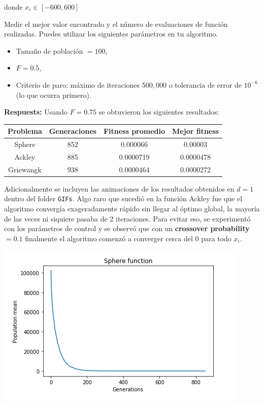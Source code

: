 \documentclass[10pt, letterpaper]{article}
\theoremstyle{definition}
\begin{document}
\begin{enumerate}
\begin{enumerate}
                donde $x_i \in [-600, 600]$
        \end{enumerate}
    Medir el mejor valor encontrado y el número de evaluaciones de función
    realizadas. Puedes utilizar los siguientes parámetros en tu algoritmo.
        \begin{itemize}
            \item Tamaño de población $=100$,
            \item $F=0.5$,
            \item Criterio de paro: máximo de iteraciones $500,000$ o tolerancia
            de error de $10^{-6}$ (lo que ocurra primero).
        \end{itemize}
    \textbf{Respuests:} Usando $F=0.75$ se obtuvieron los siguientes resultados:
    \begin{center} \begin{tabular}{ |c|c|c|c| }
        \hline
        Problema & Generaciones & Fitness promedio & Mejor fitness \\
        \hline
        Sphere  & 852 & 0.000066 & 0.00003 \\
        Ackley  & 885 & 0.0000719 & 0.0000478 \\
        Griewangk  & 938 & 0.0000464 & 0.0000272 \\
        \hline
    \end{tabular} \end{center}
    Adicionalmente se incluyen las animaciones de los resultados obtenidos
    en $d=1$ dentro del folder \texttt{GIFs}. Algo raro que sucedió en la función
    Ackley fue que el algoritmo convergía exageradamente rápido sin llegar al
    óptimo global, la mayoría de las veces ni siquiere pasaba de  2 iteraciones.
    Para evitar eso, se experimentó con los parámetros de control y se observó
    que con un \textbf{crossover probability}$=0.1$ finalmente
    el algoritmo comenzó a converger cerca del $0$ para todo $x_i$.
    \begin{center}
        \includegraphics[scale=0.6]{assets/sphere-function.png}

\end{center}
\end{enumerate}
\end{document}
